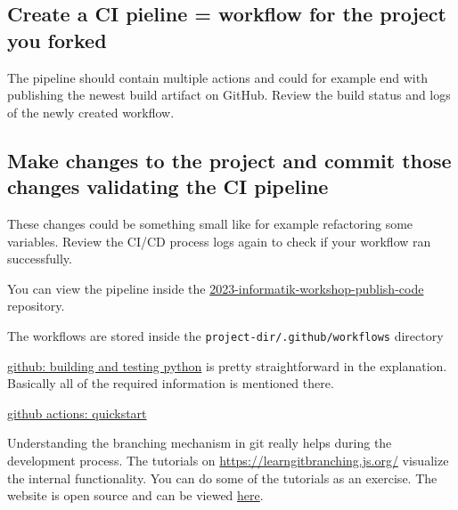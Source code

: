 \documentclass[paper=a4]{scrartcl}
\begin{document}
	\subsection*{Create a CI pieline = workflow for the project you forked} 
		The pipeline should contain multiple actions and could for example end with publishing the newest build artifact on GitHub. Review the build status and logs of the newly created workflow.
	
	\subsection*{Make changes to the project and commit those changes validating the CI pipeline}
		These changes could be something small like for example refactoring some variables. Review the CI/CD process logs again to check if your workflow ran successfully. 
		
	\begin{hints}
		\item You can view the pipeline inside the \href{https://github.com/marc-philipp-knechtle/2023-informatik-workshop-publish-code}{2023-informatik-workshop-publish-code} repository. 
		\item The workflows are stored inside the \texttt{project-dir/.github/workflows} directory
		\item \href{https://docs.github.com/en/actions/automating-builds-and-tests/building-and-testing-python}{github: building and testing python} is pretty straightforward in the explanation. Basically all of the required information is mentioned there.
	\end{hints}
	
	\begin{literature}
		\item \href{https://docs.github.com/en/actions/quickstart}{github actions: quickstart}
	\end{literature}




	Understanding the branching mechanism in git really helps during the development process. The tutorials on \url{https://learngitbranching.js.org/} visualize the internal functionality. You can do some of the tutorials as an exercise. 
	\newline The website is open source and can be viewed \href{https://github.com/pcottle/learnGitBranchin}{here}. 
\end{document}
